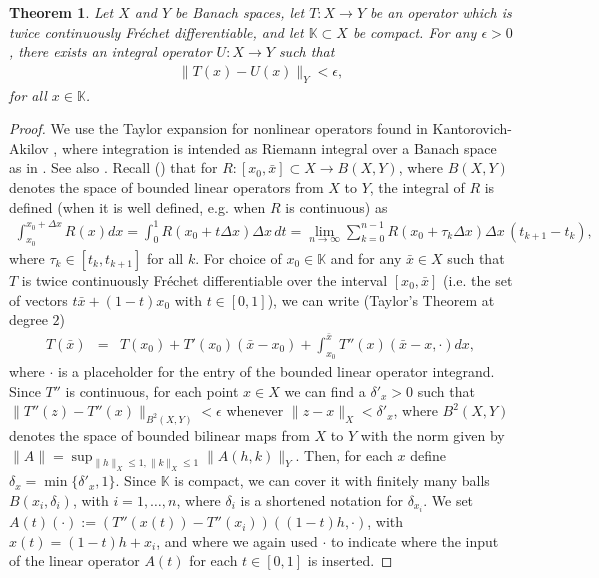 \documentclass[a4paper,12pt,reqno]{amsart}
\newtheorem{thm}{Theorem}[section]
\theoremstyle{definition}
\theoremstyle{remark}
\begin{document}
\begin{thm}\label{thm:integral}
    Let $X$ and $Y$ be Banach spaces, let $T: X \longrightarrow Y$ be an operator which is twice continuously Fr\'echet differentiable, and let $\mathbb K \subset X$ be compact. For any $\epsilon >0$, there exists an integral operator $U: X \longrightarrow Y$ such that 
        \begin{eqnarray}
            \|T(x) - U(x)\|_Y < \epsilon,
        \end{eqnarray}    
    for all $x\in \mathbb K$.
\end{thm}
\begin{proof}
    We use the Taylor expansion for nonlinear operators found in Kantorovich-Akilov \cite{kantorovich2016functional}, %
     where integration is intended as Riemann integral over a Banach space as in \cite{Gavurin}. See also \cites{gordon1991riemann,graves1927riemann}. Recall (\cites{kantorovich2016functional,Gavurin}) that for $R: [x_0, \bar x]\subset X \to  B(X,Y)$, where $B(X,Y)$ denotes the space of bounded linear operators from $X$ to $Y$, the integral of $R$ is defined (when it is well defined, e.g. when $R$ is continuous) as
    \begin{eqnarray*}
        \int_{x_0}^{x_0+\Delta x} R(x) dx = \int_0^1 R(x_0+t\Delta x) \Delta x \, dt = \lim_{n\to \infty} \sum\limits_{k=0}^{n-1} R(x_0+\tau_k\Delta x)\Delta x\,  (t_{k+1}-t_k), 
    \end{eqnarray*} 
    where $\tau_k\in [t_k,t_{k+1}]$ for all $k$. 
    For choice of $x_0 \in \mathbb K$ and for any $\bar x \in X$ such that $T$ is twice continuously Fr\'echet differentiable over the interval $[x_0, \bar x]$ (i.e. the set of vectors $t\bar x + (1-t)x_0$ with $t\in [0,1]$), we can write (Taylor's Theorem at degree $2$)
    \begin{eqnarray}
            T(\bar x) &=& T(x_0) + T'(x_0)(\bar x - x_0) + \int_{x_0}^{\bar x} T''(x)(\bar x - x , \cdot)dx, 
    \end{eqnarray}  
    where $\cdot$ is a placeholder for the entry of the bounded linear operator integrand. 
    Since $T''$ is continuous, for each point $x\in X$ we can find a $\delta'_x > 0$ such that $\|T''(z)-T''(x)\|_{B^2(X,Y)} < \epsilon$ whenever $\|z-x\|_X < \delta'_x$, where $B^2(X,Y)$ denotes the space of bounded bilinear maps from $X$ to $Y$ with the norm given by $\|A\| = \sup_{\|h\|_X\leq 1, \|k\|_X\leq 1} \|A(h,k)\|_Y$. Then, for each $x$ define $\delta_x = \min\{\delta'_x,1\}$. Since $\mathbb K$ is compact, we can cover it with finitely many balls $B(x_i,\delta_i)$, with $i=1,\ldots, n$, where $\delta_i$ is a shortened notation for $\delta_{x_i}$. We set $A(t)(\cdot) := (T''(x(t))-T''(x_i))((1-t)h,\cdot)$, with $x(t) = (1-t)h+x_i$, and where we again used $\cdot$ to indicate where the input of the linear operator $A(t)$ for each $t\in [0,1]$ is inserted. 

\end{proof}
\end{document}
